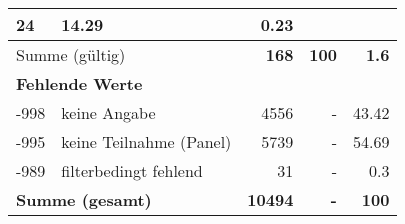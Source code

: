 \begin{longtable}{lXrrr}
       \num{24} &
       \num[round-mode=places,round-precision=2]{14.29} &
         \num[round-mode=places,round-precision=2]{0.23} \\
     \midrule
     \multicolumn{2}{l}{Summe (gültig)} &
       \textbf{\num{168}} &
     \textbf{\num{100}} &
       \textbf{\num[round-mode=places,round-precision=2]{1.6}} \\
     \multicolumn{5}{l}{\textbf{Fehlende Werte}}\\
       -998 &
       keine Angabe &
         \num{4556} &
        - &
         \num[round-mode=places,round-precision=2]{43.42} \\
       -995 &
       keine Teilnahme (Panel) &
         \num{5739} &
        - &
         \num[round-mode=places,round-precision=2]{54.69} \\
       -989 &
       filterbedingt fehlend &
         \num{31} &
        - &
         \num[round-mode=places,round-precision=2]{0.3} \\
     \midrule
     \multicolumn{2}{l}{\textbf{Summe (gesamt)}} &
          \textbf{\num{10494}} &
        \textbf{-} &
        \textbf{\num{100}} \\
     \bottomrule
     \end{longtable}
     
